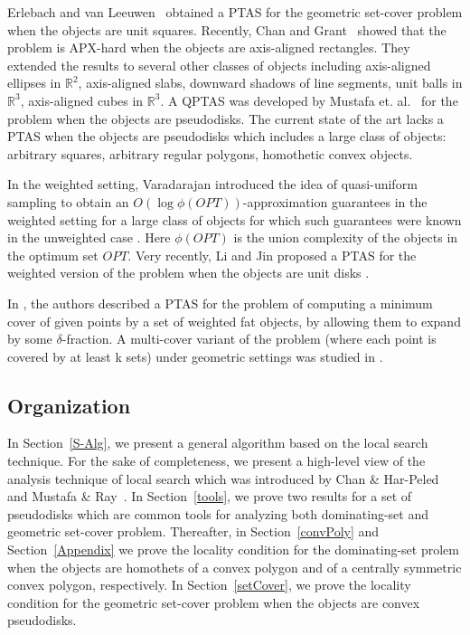 \documentclass[a4paper,11pt]{article}
\newcommand{\IR}{\mathbb{R}}
\begin{document}
Erlebach and van Leeuwen~\cite{ErlebachL10} obtained a PTAS for the geometric  
set-cover problem when the objects are unit squares. Recently, Chan and 
Grant~\cite{ChanG} showed that the  problem is APX-hard when the 
objects are  axis-aligned  rectangles.  They  extended the results to several 
other 
classes of objects including axis-aligned ellipses in $\IR^2$, axis-aligned 
slabs, 
downward shadows of line segments,  unit balls in $\IR^3$, axis-aligned 
cubes in $\IR^3$. A QPTAS {was developed by} Mustafa et. al.~\cite{Ray}  for the problem when the objects are 
pseudodisks. The current {state of the art} lacks a PTAS  when the objects are 
pseudodisks which includes  a large class of objects: arbitrary squares, 
arbitrary regular polygons, homothetic convex objects.

In the weighted setting, 
Varadarajan 
introduced the idea of quasi-uniform 
sampling to obtain {an} $O(\log \phi(OPT))$-approximation guarantees in the weighted 
setting 
for 
a large class of objects for which such guarantees were known in the 
{unweighted} case \cite{Varada}.  Here  $\phi(OPT)$ is the union complexity of 
the objects in the optimum set $OPT$. Very recently, Li and Jin  proposed a 
PTAS   for {the}
weighted version of the problem when the objects are unit disks \cite{LiJ}.
 
 
In \cite{HarPel12}, {the} authors  described a 
PTAS for the problem {of} computing a minimum cover of given points by a set of 
weighted fat objects, by allowing them to expand by some $\delta$-fraction.
  A 
{multi-cover variant of the problem (where each point is covered by at least k sets)} under 
geometric settings was studied in \cite{Chekuri}.

\subsection{Organization}

In Section~\ref{S-Alg}, we present a general  
algorithm based on the local search technique. For the sake of 
completeness, we present a high-level view of the analysis technique of local search
which was introduced by Chan \& 
Har-Peled~\cite{ChanH09} and Mustafa \& Ray~\cite{MustafaR10}.
In Section~\ref{tools}, we prove two results for a set of  pseudodisks 
which 
are common tools for analyzing both dominating-set and geometric set-cover 
problem. 
Thereafter, in 
Section~\ref{convPoly} and Section~\ref{Appendix} we prove    the locality condition 
for the dominating-set prolem when the objects are homothets of a convex polygon and of a centrally symmetric convex polygon, respectively.  In Section~\ref{setCover}, we prove the locality condition for {the} geometric set-cover problem when the  objects are convex  pseudodisks.
\end{document}
